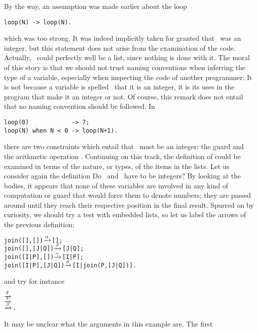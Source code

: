 By the way, an assumption was made earlier about the loop
\begin{verbatim}
loop(N) -> loop(N).
\end{verbatim}
which was too strong. It was indeed implicitly taken for granted that
~was an integer, but this statement does not arise from the
examination of the code. Actually, ~could perfectly well be
a list, since nothing is done with it. The moral of this story is that
we should not trust naming conventions when inferring the type of a
variable, especially when inspecting the code of another
programmer. It is not because a variable is spelled~ that
it is an integer, it is its uses in the program that make it an
integer or not. Of course, this remark does not entail that no naming
convention should be followed. In
\begin{verbatim}
loop(0)            -> 7;
loop(N) when N < 0 -> loop(N+1).
\end{verbatim}
there are two constraints which entail that ~must be an
integer: the guard  and the arithmetic operation
. Continuing on this track, the definition of
 could be examined in terms of the nature, or types,
of the items in the lists. Let us consider again the definition
 Do ~and~ have to be
integers? By looking at the bodies, it appears that none of these
variables are involved in any kind of computation or guard that would
force them to denote numbers; they are passed around until they reach
their respective position in the final result. Spurred on by
curiosity, we should try a test with embedded lists, so let us label
the arrows of the previous definition:
\begin{alltt}
join(   [],   []) \(\smashedrightarrow{\alpha}\) [];
join(   [],[J|Q]) \(\smashedrightarrow{\beta}\) [J|Q];
join([I|P],   []) \(\smashedrightarrow{\gamma}\) [I|P];
join([I|P],[J|Q]) \(\smashedrightarrow{\delta}\) [I|join(P,[J|Q])].
\end{alltt}
and try for instance
\begin{alltt}
                           \(\smashedrightarrow{\delta}\) 
                           \(\smashedrightarrow{\delta}\) 
                           \(\smashedrightarrow{\beta}\) \textrm{.}
\end{alltt}
It may be unclear what the arguments in this example are. The first
